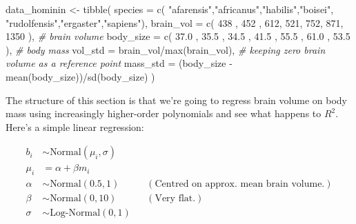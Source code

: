 \documentclass[
]{book}
\newenvironment{Shaded}{\begin{snugshade}}{\end{snugshade}}
\newcommand{\AttributeTok}[1]{\textcolor[rgb]{0.77,0.63,0.00}{#1}}
\newcommand{\CommentTok}[1]{\textcolor[rgb]{0.56,0.35,0.01}{\textit{#1}}}
\newcommand{\DecValTok}[1]{\textcolor[rgb]{0.00,0.00,0.81}{#1}}
\newcommand{\FloatTok}[1]{\textcolor[rgb]{0.00,0.00,0.81}{#1}}
\newcommand{\FunctionTok}[1]{\textcolor[rgb]{0.00,0.00,0.00}{#1}}
\newcommand{\NormalTok}[1]{#1}
\newcommand{\OtherTok}[1]{\textcolor[rgb]{0.56,0.35,0.01}{#1}}
\newcommand{\SpecialCharTok}[1]{\textcolor[rgb]{0.00,0.00,0.00}{#1}}
\newcommand{\StringTok}[1]{\textcolor[rgb]{0.31,0.60,0.02}{#1}}
\begin{document}
\begin{Shaded}
\begin{Highlighting}[]
\NormalTok{data\_hominin }\OtherTok{\textless{}{-}} \FunctionTok{tibble}\NormalTok{(}
  \AttributeTok{species =} \FunctionTok{c}\NormalTok{( }\StringTok{"afarensis"}\NormalTok{,}\StringTok{"africanus"}\NormalTok{,}\StringTok{"habilis"}\NormalTok{,}\StringTok{"boisei"}\NormalTok{, }\StringTok{"rudolfensis"}\NormalTok{,}\StringTok{"ergaster"}\NormalTok{,}\StringTok{"sapiens"}\NormalTok{),}
  \AttributeTok{brain\_vol =} \FunctionTok{c}\NormalTok{( }\DecValTok{438}\NormalTok{ , }\DecValTok{452}\NormalTok{ , }\DecValTok{612}\NormalTok{, }\DecValTok{521}\NormalTok{, }\DecValTok{752}\NormalTok{, }\DecValTok{871}\NormalTok{, }\DecValTok{1350}\NormalTok{ ), }\CommentTok{\# brain volume}
  \AttributeTok{body\_size =} \FunctionTok{c}\NormalTok{( }\FloatTok{37.0}\NormalTok{ , }\FloatTok{35.5}\NormalTok{ , }\FloatTok{34.5}\NormalTok{ , }\FloatTok{41.5}\NormalTok{ , }\FloatTok{55.5}\NormalTok{ , }\FloatTok{61.0}\NormalTok{ , }\FloatTok{53.5}\NormalTok{ ), }\CommentTok{\# body mass}
  \AttributeTok{vol\_std =}\NormalTok{ brain\_vol}\SpecialCharTok{/}\FunctionTok{max}\NormalTok{(brain\_vol), }\CommentTok{\# keeping zero brain volume as a reference point}
  \AttributeTok{mass\_std =}\NormalTok{ (body\_size }\SpecialCharTok{{-}} \FunctionTok{mean}\NormalTok{(body\_size))}\SpecialCharTok{/}\FunctionTok{sd}\NormalTok{(body\_size)}
\NormalTok{)}
\end{Highlighting}
\end{Shaded}

The structure of this section is that we're going to regress brain volume on body mass using increasingly higher-order polynomials and see what happens to \(R^2\). Here's a simple linear regression:

\[
\begin{aligned}
b_i &\sim \text{Normal}(\mu_i,\sigma)\\
\mu_i &= \alpha + \beta m_i \\
\alpha &\sim \text{Normal}(0.5,1)&& (\text{Centred on approx. mean brain volume.})\\
\beta &\sim \text{Normal}(0,10)&& (\text{Very flat.})\\
\sigma &\sim \text{Log-Normal}(0,1)\\
\end{aligned}
\]
\end{document}
